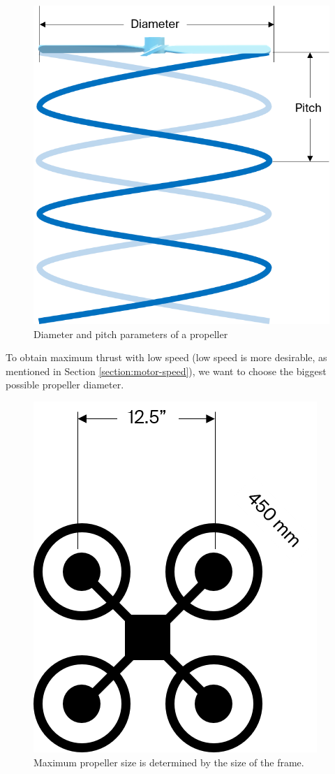 \begin{figure}[H]
    \centering
    \includegraphics[scale=0.5]{img/proppitch}
    \caption{Diameter and pitch parameters of a propeller}
    \label{fig:propeller}
\end{figure}

To obtain maximum thrust with low speed (low speed is more desirable, as mentioned in Section \ref{section:motor-speed}), we want to choose the biggest possible propeller diameter.

\begin{figure}[H]
    \centering
    \includegraphics[scale=0.5]{img/framepropsize}
    \caption{Maximum propeller size is determined by the size of the frame.}
    \label{fig:framepropsize}
\end{figure}

